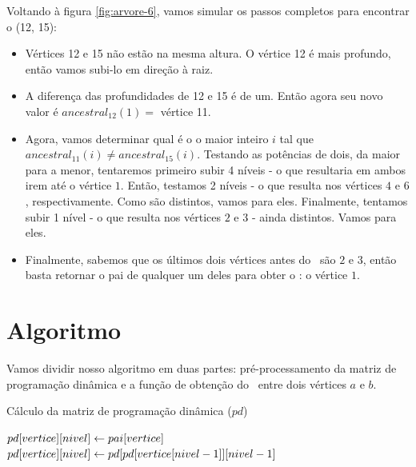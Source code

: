 \vspace{1cm}

Voltando à figura \ref{fig:arvore-6}, vamos simular os passos completos para encontrar o \LCA(12, 15):

\begin{itemize}
    \item Vértices 12 e 15 não estão na mesma altura. O vértice 12 é mais profundo, então vamos subi-lo em direção à raiz.
    \item A diferença das profundidades de 12 e 15 é de um. Então agora seu novo valor é $ancestral_{12}(1) =$ vértice 11.
    \item Agora, vamos determinar qual é o o maior inteiro $i$ tal que $ancestral_{11}(i) \neq ancestral_{15}(i)$. Testando as potências de dois, da maior para a menor, tentaremos primeiro subir 4 níveis - o que resultaria em ambos irem até o vértice $1$. Então, testamos 2 níveis - o que resulta nos vértices $4$ e $6$, respectivamente. Como são distintos, vamos para eles. Finalmente, tentamos subir 1 nível - o que resulta nos vértices $2$ e $3$ - ainda distintos. Vamos para eles.
    \item Finalmente, sabemos que os últimos dois vértices antes do \LCA\ são $2$ e $3$, então basta retornar o pai de qualquer um deles para obter o \LCA: o vértice $1$.
\end{itemize}


\vspace{10cm}

\section{Algoritmo}

Vamos dividir nosso algoritmo em duas partes: pré-processamento da matriz de programação dinâmica e a função de obtenção do \LCA\ entre dois vértices $a$ e $b$.

\begin{algorithm}[H]
\caption{Cálculo da matriz de programação dinâmica ($pd$)}
\begin{algorithmic}[1]
                \State $pd[vertice][nivel] \leftarrow pai[vertice]$
            \Else
                \State $pd[vertice][nivel] \leftarrow pd[pd[vertice[nivel-1]][nivel-1]$
            \EndIf
        \EndFor
    \EndFor
\EndFunction
\end{algorithmic}
\end{algorithm}



